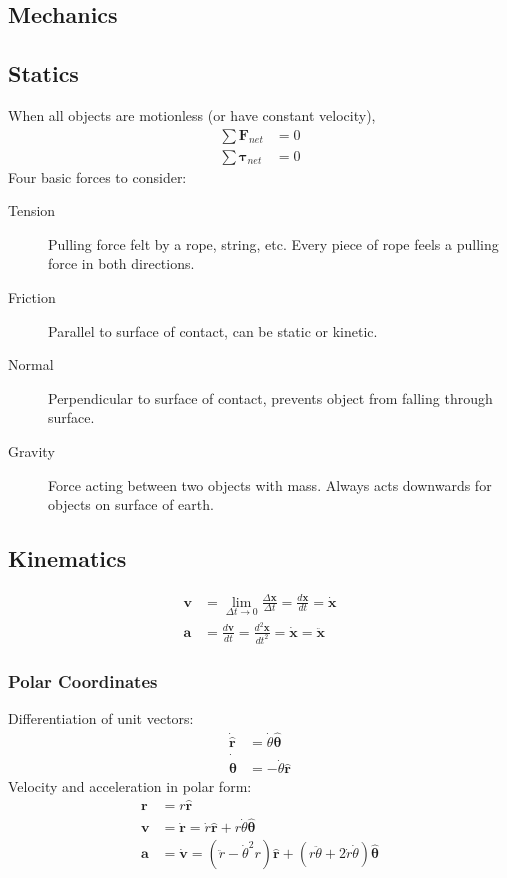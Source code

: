 \documentclass[a4paper]{article}
\newcommand{\ve}[1]{
  \ensuremath{\bm{#1}}}	               %
\newcommand{\uve}[1]{
  \ensuremath{\bm{\hat{#1}}}}          %
\begin{document}
\begin{multicols*}{2}
\section{Mechanics}
\subsection{Statics}
When all objects are motionless (or have constant velocity),
\begin{align*}
  \sum{\ve{F}_{net}}&=0 \\
  \sum{\ve{\tau}_{net}}&=0
\end{align*}
Four basic forces to consider:
\begin{description}
\item[Tension] Pulling force felt by a rope, string, etc. Every piece of rope
  feels a pulling force in both directions.
\item[Friction] Parallel to surface of contact, can be static or kinetic.
\item[Normal] Perpendicular to surface of contact, prevents object from falling
  through surface.
\item[Gravity] Force acting between two objects with mass. Always acts downwards
  for objects on surface of earth.
\end{description}
\subsection{Kinematics}
\begin{align*}
  \ve{v} &= \lim_{\Delta t \rightarrow 0} \frac{\Delta \ve{x}}{\Delta t} = \frac{d\ve{x}}{dt} = 	\ve{\dot{x}} \\
  \ve{a} &= \frac{d\ve{v}}{dt} = \frac{d^2\ve{x}}{dt^2} = \ve{\dot{x}} =
  \ve{\ddot{x}}
\end{align*}
\subsubsection{Polar Coordinates}
Differentiation of unit vectors:
\begin{align*}
  \dot{\uve{r}} &= \dot{\theta} \uve{\theta}\\
  \dot{\uve{\theta}} &= -\dot{\theta} \uve{r}
\end{align*}
Velocity and acceleration in polar form:
\begin{align*}
  \ve{r} &= r\uve{r} \\
  \ve{v} &= \dot{\ve{r}} = \dot{r} \uve{r} + r \dot{\theta} \uve{\theta} \\
  \ve{a} &= \dot{\ve{v}} = (\ddot{r} - \dot{\theta}^2 r) \uve{r} + (r
  \ddot{\theta} + 2 \dot{r} \dot{\theta})\uve{\theta}
\end{align*}

\end{multicols*}
\end{document}
